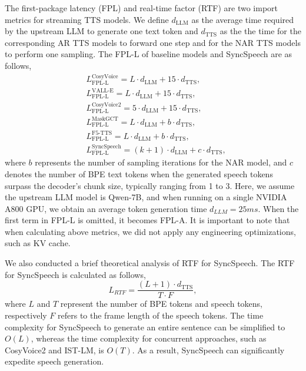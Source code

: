 The first-package latency (FPL) and real-time factor (RTF) are two import metrics for streaming TTS models.
We define $d_{\text{LLM}}$ as the average time required by the upstream LLM to generate one text token and $d_{\text{TTS}}$ as the the time for the corresponding AR TTS models to forward one step and for the NAR TTS models to perform one sampling. The FPL-L of baseline models and SyncSpeech are as follows,
\begin{align}
& L_{\text{FPL-L}}^{\text{CosyVoice}} =L \cdot d_{\text{LLM}} + 15 \cdot d_{\text{TTS}}, \\
& L_{\text{FPL-L}}^{\text{VALL-E}} =L \cdot d_{\text{LLM}} + 15 \cdot d_{\text{TTS}}, \\
&L_{\text{FPL-L}}^{\text{CosyVoice2}} =5 \cdot d_{\text{LLM}} + 15 \cdot d_{\text{TTS}}, \\
& L_{\text{FPL-L}}^{\text{MaskGCT}} =L \cdot d_{\text{LLM}} + b \cdot d_{\text{TTS}}, \\
& L_{\text{FPL-L}}^{\text{F5-TTS}} =L \cdot d_{\text{LLM}} + b \cdot d_{\text{TTS}}, \\
&L_{\text{FPL-L}}^{\text{SyncSpeech}} =(k+1) \cdot d_{\text{LLM}} + c \cdot d_{\text{TTS}},
\end{align}
where $b$ represents the number of sampling iterations for the NAR model, and $c$ denotes the number of BPE text tokens when the generated speech tokens surpass the decoder's chunk size, typically ranging from 1 to 3. Here, we assume the upstream LLM model is Qwen-7B, and when running on a single NVIDIA A800 GPU, we obtain an average token generation time $d_{LLM} = 25 ms$. 
When the first term in FPL-L is omitted, it becomes FPL-A. It is important to note that when calculating above metrics, we did not apply any engineering optimizations, such as KV cache.

We also conducted a brief theoretical analysis of RTF for SyncSpeech. The RTF for SyncSpeech is calculated as follows,
\begin{equation}
L_{RTF} = \frac{ (L+1) \cdot d_{\text{TTS}}}{T\cdot F},
\end{equation}
where $L$ and $T$ represent the number of BPE tokens and speech tokens, respectively $F$ refers to the frame length of the speech tokens.  The time complexity for SyncSpeech to generate an entire sentence can be simplified to $O(L)$, whereas the time complexity for concurrent approaches, such as CosyVoice2 and IST-LM, is 
$O(T)$. As a result, SyncSpeech can significantly expedite speech generation.


